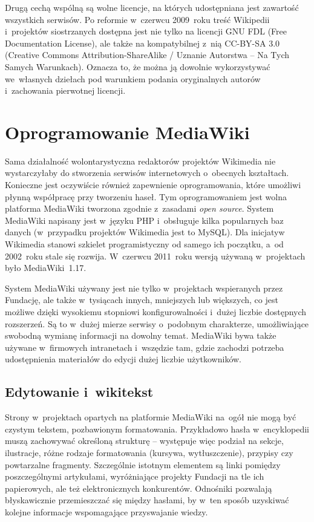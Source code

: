 \documentclass{pracamgr}
\begin{document}
Drugą cechą wspólną są wolne licencje, na których udostępniana jest zawartość wszystkich serwisów. Po reformie w~czerwcu 2009~roku treść Wikipedii i~projektów siostrzanych dostępna jest nie tylko na licencji GNU FDL (Free Documentation License), ale także na kompatybilnej z~nią CC-BY-SA 3.0 (Creative Commons Attribution-ShareAlike / Uznanie Autorstwa -- Na Tych Samych Warunkach). %
Oznacza to, że można ją dowolnie wykorzystywać we~własnych dziełach pod warunkiem podania oryginalnych autorów i~zachowania pierwotnej licencji.

\section{Oprogramowanie MediaWiki}
Sama działalność wolontarystyczna redaktorów projektów Wikimedia nie wystarczyłaby do stworzenia serwisów internetowych o~obecnych kształtach. Konieczne jest oczywiście również zapewnienie oprogramowania, które umożliwi płynną współpracę przy tworzeniu haseł. Tym oprogramowaniem jest wolna platforma MediaWiki tworzona zgodnie z~zasadami \emph{open source}. System MediaWiki napisany jest w~języku PHP i~obsługuje kilka popularnych baz danych (w~przypadku projektów Wikimedia jest to MySQL). Dla inicjatyw Wikimedia stanowi szkielet programistyczny od samego ich początku, a~od 2002~roku stale się rozwija. W~czerwcu 2011~roku wersją używaną w~projektach było MediaWiki~1.17.

System MediaWiki używany jest nie tylko w~projektach wspieranych przez Fundację, ale także w~tysiącach innych, mniejszych lub większych, co jest możliwe dzięki wysokiemu stopniowi konfigurowalności i~dużej liczbie dostępnych rozszerzeń. Są to w~dużej mierze serwisy o~podobnym charakterze, umożliwiające swobodną wymianę informacji na dowolny temat. MediaWiki bywa także używane w~firmowych intranetach i~wszędzie tam, gdzie zachodzi potrzeba udostępnienia materiałów do edycji dużej liczbie użytkowników.

\subsection{Edytowanie i~wikitekst}
Strony w~projektach opartych na platformie MediaWiki na~ogół nie mogą być czystym tekstem, pozbawionym formatowania. Przykładowo hasła w~encyklopedii muszą zachowywać określoną strukturę -- występuje więc podział na sekcje, ilustracje, różne rodzaje formatowania (kursywa, wytłuszczenie), przypisy czy powtarzalne fragmenty. Szczególnie istotnym elementem są linki pomiędzy poszczególnymi artykułami, wyróżniające projekty Fundacji na tle ich papierowych, ale też elektronicznych konkurentów. Odnośniki pozwalają błyskawicznie przemieszczać się między hasłami, by w~ten sposób uzyskiwać kolejne informacje wspomagające przyswajanie wiedzy.
\end{document}

